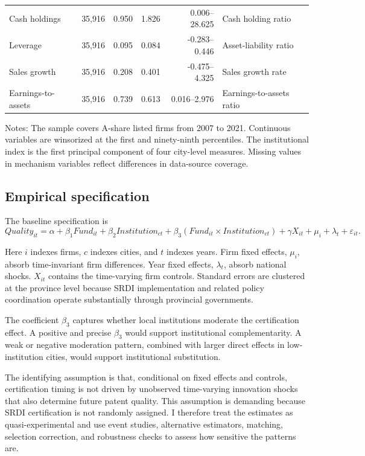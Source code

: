 \documentclass[12pt]{article}
\begin{document}
\begin{table}[htbp]
{\begin{tabular}{lrrrrl}
Cash holdings & 35,916 & 0.950 & 1.826 & 0.006--28.625 & Cash holding ratio \\
Leverage & 35,916 & 0.095 & 0.084 & -0.283--0.446 & Asset-liability ratio \\
Sales growth & 35,916 & 0.208 & 0.401 & -0.475--4.325 & Sales growth rate \\
Earnings-to-assets & 35,916 & 0.739 & 0.613 & 0.016--2.976 & Earnings-to-assets ratio \\
\bottomrule
\end{tabular}}
\begin{minipage}{0.96\textwidth}
\footnotesize Notes: The sample covers A-share listed firms from 2007 to 2021. Continuous variables are winsorized at the first and ninety-ninth percentiles. The institutional index is the first principal component of four city-level measures. Missing values in mechanism variables reflect differences in data-source coverage.
\end{minipage}
\end{table}

\subsection{Empirical specification}

The baseline specification is
\begin{equation}
\textit{Quality}_{it} =
\alpha + \beta_1 \textit{Fund}_{it}
+ \beta_2 \textit{Institution}_{ct}
+ \beta_3(\textit{Fund}_{it}\times \textit{Institution}_{ct})
+ \gamma X_{it} + \mu_i + \lambda_t + \varepsilon_{it}.
\end{equation}

Here \(i\) indexes firms, \(c\) indexes cities, and \(t\) indexes years. Firm fixed effects, \(\mu_i\), absorb time-invariant firm differences. Year fixed effects, \(\lambda_t\), absorb national shocks. \(X_{it}\) contains the time-varying firm controls. Standard errors are clustered at the province level because SRDI implementation and related policy coordination operate substantially through provincial governments.

The coefficient \(\beta_3\) captures whether local institutions moderate the certification effect. A positive and precise \(\beta_3\) would support institutional complementarity. A weak or negative moderation pattern, combined with larger direct effects in low-institution cities, would support institutional substitution.

The identifying assumption is that, conditional on fixed effects and controls, certification timing is not driven by unobserved time-varying innovation shocks that also determine future patent quality. This assumption is demanding because SRDI certification is not randomly assigned. I therefore treat the estimates as quasi-experimental and use event studies, alternative estimators, matching, selection correction, and robustness checks to assess how sensitive the patterns are.
\end{document}
